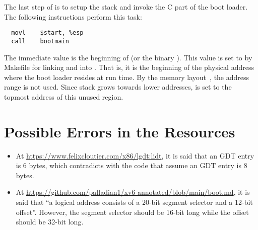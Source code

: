 \documentclass{article}
\begin{document}
The last step of  is to setup the stack and invoke the
C part of the boot loader. The following instructions perform this
task:
%
\begin{verbatim}
  movl    $start, %esp
  call    bootmain
\end{verbatim}
%
The immediate value  is the beginning of
 (or the binary ). This value is set
to  by Makefile for linking  and
 into . That is, it is the beginning
of the physical address where the boot loader resides at run time. By
the memory layout~\cite{yale-cs422-as1}, the address range \code{[0 -
  0x7c00]} is not used. Since stack grows towards lower addresses,
 is set to the topmost address of this unused region.


\section{Possible Errors in the Resources}

\begin{itemize}
\item At \url{https://www.felixcloutier.com/x86/lgdt:lidt}, it is said
  that an GDT entry is 6 bytes, which contradicts with the code that
  assume an GDT entry is 8 bytes.

\item At
  \url{https://github.com/palladian1/xv6-annotated/blob/main/boot.md},
  it is said that ``a logical address consists of a 20-bit segment
  selector and a 12-bit offset''. However, the segment selector should
  be 16-bit long while the offset should be 32-bit long. 

\end{itemize}




\end{document}
